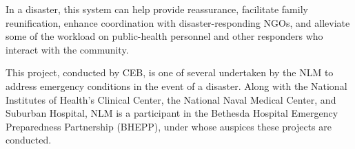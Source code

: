 
\begin{xpsectionbox}{}{}

In a disaster, this system can help provide reassurance, facilitate family reunification, enhance coordination with disaster-responding NGOs, and alleviate some of the workload on public-health personnel and other responders who interact with the community.
\newline

\noindent This project, conducted by CEB, is one of several undertaken by the NLM to address emergency conditions in the event of a disaster. Along with the National Institutes of Health's Clinical Center, the National Naval Medical Center, and Suburban Hospital, NLM is a participant in the Bethesda Hospital Emergency Preparedness Partnership (BHEPP), under whose auspices these projects are conducted.

%
%
%
\end{xpsectionbox}



